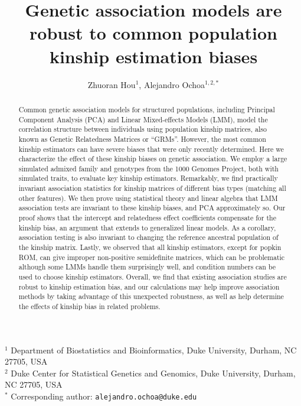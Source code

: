 \documentclass[11pt]{article}
\title{\Large \textbf{Genetic association models are robust to common population kinship estimation biases}}
\author{Zhuoran Hou$^1$, Alejandro Ochoa$^{1,2,*}$}
\date{}
\begin{document}
\begin{linenumbers}

\maketitle

\noindent
$^1$ Department of Biostatistics and Bioinformatics, Duke University, Durham, NC 27705, USA \\
$^2$ Duke Center for Statistical Genetics and Genomics, Duke University, Durham, NC 27705, USA \\
$^*$ Corresponding author: \texttt{alejandro.ochoa@duke.edu}


\begin{abstract}
  Common genetic association models for structured populations, including Principal Component Analysis (PCA) and Linear Mixed-effects Models (LMM), model the correlation structure between individuals using population kinship matrices, also known as Genetic Relatedness Matrices or ``GRMs''.
  However, the most common kinship estimators can have severe biases that were only recently determined.
  Here we characterize the effect of these kinship biases on genetic association.
  We employ a large simulated admixed family and genotypes from the 1000 Genomes Project, both with simulated traits, to evaluate key kinship estimators.
  Remarkably, we find practically invariant association statistics for kinship matrices of different bias types (matching all other features).
  We then prove using statistical theory and linear algebra that LMM association tests are invariant to these kinship biases, and PCA approximately so.
  Our proof shows that the intercept and relatedness effect coefficients compensate for the kinship bias, an argument that extends to generalized linear models.
  As a corollary, association testing is also invariant to changing the reference ancestral population of the kinship matrix.
  Lastly, we observed that all kinship estimators, except for popkin ROM, can give improper non-positive semidefinite matrices, which can be problematic although some LMMs handle them surprisingly well, and condition numbers can be used to choose kinship estimators.
  Overall, we find that existing association studies are robust to kinship estimation bias, and our calculations may help improve association methods by taking advantage of this unexpected robustness, as well as help determine the effects of kinship bias in related problems.
\end{abstract}


\end{linenumbers}
\end{document}
